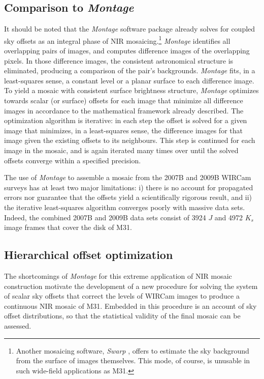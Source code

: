 \documentclass[iop]{emulateapj}
\newcommand{\sw}[1]{\textit{#1}} %
\begin{document}
\subsection{Comparison to \sw{Montage}}
It should be noted that the \sw{Montage} software package \citep{Berriman:2008} already solves for coupled sky offsets as an integral phase of NIR mosaicing.\footnote{Another mosaicing software, \sw{Swarp} \citep{Bertin:2002}, offers to estimate the sky background from the surface of images themselves. This mode, of course, is unusable in such wide-field applications as M31.} \sw{Montage} identifies all overlapping pairs of images, and computes difference images of the overlapping pixels. In those difference images, the consistent astronomical structure is eliminated, producing a comparison of the pair's backgrounds. \sw{Montage} fits, in a least-squares sense, a constant level or a planar surface to each difference image. To yield a mosaic with consistent surface brightness structure, \sw{Montage} optimizes towards scalar (or surface) offsets for each image that minimize all difference images in accordance to the mathematical framework already described. The optimization algorithm is iterative: in each step the offset is solved for a given image that minimizes, in a least-squares sense, the difference images for that image given the existing offsets to its neighbours. This step is continued for each image in the mosaic, and is again iterated many times over until the solved offsets converge within a specified precision.

The use of \sw{Montage} to assemble a mosaic from the 2007B and 2009B WIRCam surveys has at least two major limitations: i) there is no account for propagated errors nor guarantee that the offsets yield a scientifically rigorous result, and ii) the iterative least-squares algorithm converges poorly with massive data sets. Indeed, the combined 2007B and 2009B data sets consist of 3924 $J$ and 4972 $K_s$ image frames that cover the disk of M31.

\subsection{Hierarchical offset optimization}
\label{sec:hierarchicaloffsets}

The shortcomings of \sw{Montage} for this extreme application of NIR mosaic construction motivate the development of a new procedure for solving the system of scalar sky offsets that correct the levels of WIRCam images to produce a continuous NIR mosaic of M31. Embedded in this procedure is an account of sky offset distributions, so that the statistical validity of the final mosaic can be assessed.
\end{document}
